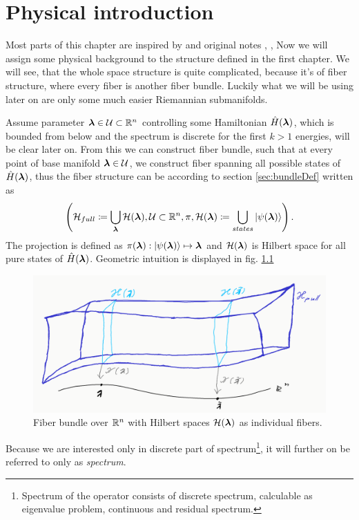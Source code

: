 \chapter{Physical introduction}

Most parts of this chapter are inspired by \citep{kolodrubez} and original notes \citep{berry1984}, \citep{berry1989}, \citep{berry2009}
Now we will assign some physical background to the structure defined in the first chapter. We will see, that the whole space structure is quite complicated, because it's of fiber structure, where every fiber is another fiber bundle. Luckily what we will be using later on are only some much easier Riemannian submanifolds. 


Assume parameter ${\bm\lambda}\in\mathcal{U}\subset\mathbb{R}^n$ controlling some Hamiltonian $\hat{H}({\bm\lambda})$, which is bounded from below and the spectrum is discrete for the first $k>1$ energies, will be clear later on. From this we can construct fiber bundle, such that at every point of base manifold ${\bm\lambda}\in \mathcal{U}$, we construct fiber spanning all possible states of $\hat{H}({\bm\lambda})$, thus the fiber structure can be according to section \ref{sec:bundleDef} written as
$$\left(\mathcal{H}_{full}\coloneqq \bigcup_{\bm\lambda} \mathcal{H}({\bm\lambda}),\mathcal{U}\subset \mathbb{R}^n,\pi, \mathcal{H}({\bm\lambda}) \coloneqq \bigcup_{states}\ket{\psi({\bm\lambda})}  \right).$$
The projection is defined as $\pi({\bm\lambda}): \ket{\psi({\bm\lambda})}\mapsto {\bm\lambda}$ and $\mathcal{H}({\bm\lambda})$ is Hilbert space for all pure states of $\hat{H}({\bm\lambda})$. 
Geometric intuition is displayed in fig. \ref{fig:wholeBundle}
\begin{figure}[h]
    \centering
    \includegraphics[width=\textwidth]{../img/manifold_basic.png}
\caption{Fiber bundle over $\mathbb{R}^n$ with Hilbert spaces $\mathcal{H}({\bm\lambda})$ as individual fibers.}
    \label{fig:wholeBundle}
\end{figure}


Because we are interested only in discrete part of spectrum\footnote{Spectrum of the operator consists of discrete spectrum, calculable as eigenvalue problem, continuous and residual spectrum.}, it will further on be referred to only as \emph{spectrum}. 

